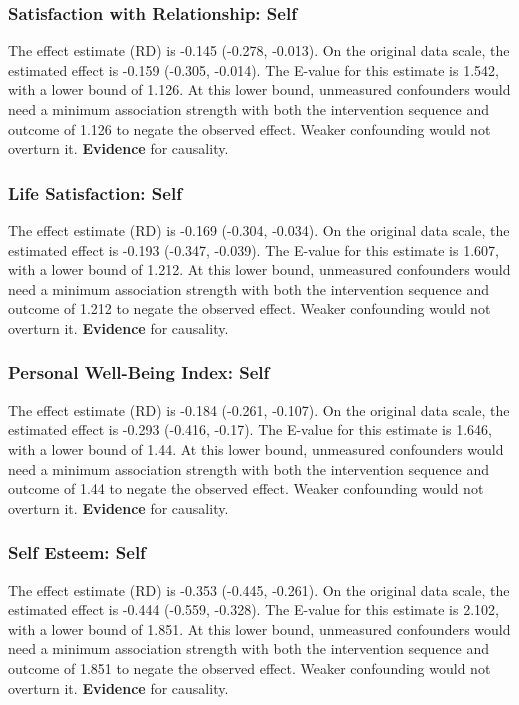 \documentclass[
  singlecolumn]{article}
\begin{document}
\subsubsection{Satisfaction with Relationship:
Self}\label{satisfaction-with-relationship-self-15}

The effect estimate (RD) is -0.145 (-0.278, -0.013). On the original
data scale, the estimated effect is -0.159 (-0.305, -0.014). The E-value
for this estimate is 1.542, with a lower bound of 1.126. At this lower
bound, unmeasured confounders would need a minimum association strength
with both the intervention sequence and outcome of 1.126 to negate the
observed effect. Weaker confounding would not overturn it.
\textbf{Evidence} for causality.

\subsubsection{Life Satisfaction: Self}\label{life-satisfaction-self-15}

The effect estimate (RD) is -0.169 (-0.304, -0.034). On the original
data scale, the estimated effect is -0.193 (-0.347, -0.039). The E-value
for this estimate is 1.607, with a lower bound of 1.212. At this lower
bound, unmeasured confounders would need a minimum association strength
with both the intervention sequence and outcome of 1.212 to negate the
observed effect. Weaker confounding would not overturn it.
\textbf{Evidence} for causality.

\subsubsection{Personal Well-Being Index:
Self}\label{personal-well-being-index-self-15}

The effect estimate (RD) is -0.184 (-0.261, -0.107). On the original
data scale, the estimated effect is -0.293 (-0.416, -0.17). The E-value
for this estimate is 1.646, with a lower bound of 1.44. At this lower
bound, unmeasured confounders would need a minimum association strength
with both the intervention sequence and outcome of 1.44 to negate the
observed effect. Weaker confounding would not overturn it.
\textbf{Evidence} for causality.

\subsubsection{Self Esteem: Self}\label{self-esteem-self-15}

The effect estimate (RD) is -0.353 (-0.445, -0.261). On the original
data scale, the estimated effect is -0.444 (-0.559, -0.328). The E-value
for this estimate is 2.102, with a lower bound of 1.851. At this lower
bound, unmeasured confounders would need a minimum association strength
with both the intervention sequence and outcome of 1.851 to negate the
observed effect. Weaker confounding would not overturn it.
\textbf{Evidence} for causality.
\end{document}
